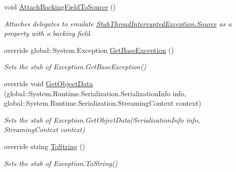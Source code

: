 \begin{DoxyCompactItemize}
void \hyperlink{class_system_1_1_threading_1_1_fakes_1_1_stub_thread_interrupted_exception_a0ac8f6ee3c3ef7c0664fe2a2ed44b6b3}{Attach\-Backing\-Field\-To\-Source} ()
\begin{DoxyCompactList}\small\item\em Attaches delegates to emulate \hyperlink{class_system_1_1_threading_1_1_fakes_1_1_stub_thread_interrupted_exception_aaff588d4968582c409eee979be6a75a3}{Stub\-Thread\-Interrupted\-Exception.\-Source} as a property with a backing field.\end{DoxyCompactList}\item 
override global\-::\-System.\-Exception \hyperlink{class_system_1_1_threading_1_1_fakes_1_1_stub_thread_interrupted_exception_a043b636b2247496a33267c95fe5846c0}{Get\-Base\-Exception} ()
\begin{DoxyCompactList}\small\item\em Sets the stub of Exception.\-Get\-Base\-Exception()\end{DoxyCompactList}\item 
override void \hyperlink{class_system_1_1_threading_1_1_fakes_1_1_stub_thread_interrupted_exception_a9dc465f6bbda06f3554bcc35c1581cf3}{Get\-Object\-Data} (global\-::\-System.\-Runtime.\-Serialization.\-Serialization\-Info info, global\-::\-System.\-Runtime.\-Serialization.\-Streaming\-Context context)
\begin{DoxyCompactList}\small\item\em Sets the stub of Exception.\-Get\-Object\-Data(\-Serialization\-Info info, Streaming\-Context context)\end{DoxyCompactList}\item 
override string \hyperlink{class_system_1_1_threading_1_1_fakes_1_1_stub_thread_interrupted_exception_aefd5801d01626a178a6c217fa0321fe9}{To\-String} ()
\begin{DoxyCompactList}\small\item\em Sets the stub of Exception.\-To\-String()\end{DoxyCompactList}\end{DoxyCompactItemize}
